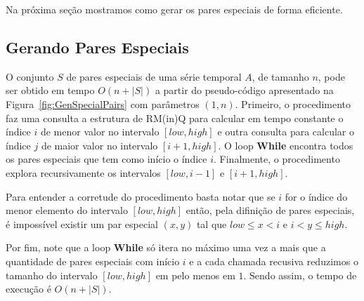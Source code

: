 \documentclass[dissertacao, brazil]{ThesisPUC}
\begin{document}
Na próxima seção mostramos como gerar os pares especiais de forma eficiente.

\subsection{Gerando Pares Especiais}

O conjunto $S$ de pares especiais de uma série temporal $A$, de tamanho $n$, pode ser obtido
em tempo $O(n + |S|)$ a partir do pseudo-código apresentado na Figura~\ref{fig:GenSpecialPairs}
com parâmetros $(1, n)$. Primeiro, o procedimento faz uma consulta a estrutura de RM(in)Q para calcular
em tempo constante o índice $i$ de menor valor no intervalo $[low, high]$ e outra consulta
para calcular o índice $j$ de maior valor no intervalo $[i + 1, high]$. 
O loop {\bf While} encontra todos os pares especiais que tem como início o índice $i$.
Finalmente, o procedimento explora recursivamente os intervalos $[low, i - 1]$ e $[i + 1, high]$.

Para entender a corretude do procedimento basta notar que se $i$ for o índice
do menor elemento do intervalo $[low, high]$ então, pela difinição de pares especiais,
é impossível existir um par especial $(x, y)$ tal que $low \le x < i$ e $i < y \le high$.

Por fim, note que a loop {\bf While} só itera no máximo uma vez a mais que a quantidade
de pares especiais com início $i$ e a cada chamada recusiva reduzimos o tamanho do intervalo
$[low, high]$ em pelo menos em $1$. Sendo assim, o tempo de execução é $O(n + |S|)$.
\end{document}
